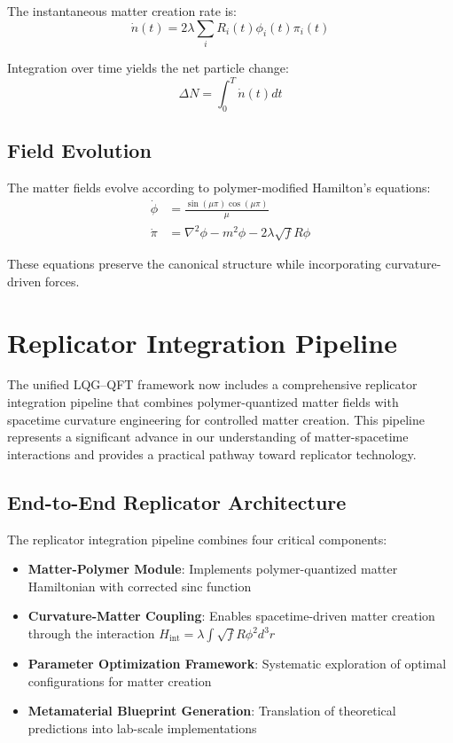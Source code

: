 \documentclass[11pt]{article}
\begin{document}
The instantaneous matter creation rate is:
\begin{equation}
\dot{n}(t) = 2\lambda \sum_i R_i(t) \phi_i(t) \pi_i(t)
\end{equation}

Integration over time yields the net particle change:
\begin{equation}
\Delta N = \int_0^T \dot{n}(t) dt
\end{equation}

\subsection{Field Evolution}

The matter fields evolve according to polymer-modified Hamilton's equations:
\begin{align}
\dot{\phi} &= \frac{\sin(\mu\pi)\cos(\mu\pi)}{\mu} \\
\dot{\pi} &= \nabla^2\phi - m^2\phi - 2\lambda\sqrt{f}R\phi
\end{align}

These equations preserve the canonical structure while incorporating curvature-driven forces.

\section{Replicator Integration Pipeline}

The unified LQG–QFT framework now includes a comprehensive replicator integration pipeline that combines polymer-quantized matter fields with spacetime curvature engineering for controlled matter creation. This pipeline represents a significant advance in our understanding of matter-spacetime interactions and provides a practical pathway toward replicator technology.

\subsection{End-to-End Replicator Architecture}

The replicator integration pipeline combines four critical components:
\begin{itemize}
\item \textbf{Matter-Polymer Module}: Implements polymer-quantized matter Hamiltonian with corrected sinc function
\item \textbf{Curvature-Matter Coupling}: Enables spacetime-driven matter creation through the interaction $H_{\text{int}} = \lambda \int \sqrt{f} R \phi^2 d^3r$
\item \textbf{Parameter Optimization Framework}: Systematic exploration of optimal configurations for matter creation
\item \textbf{Metamaterial Blueprint Generation}: Translation of theoretical predictions into lab-scale implementations
\end{itemize}
\end{document}
